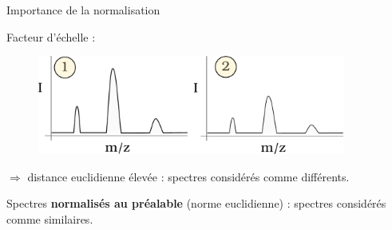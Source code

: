 \documentclass[10pt]{beamer}
\begin{document}
\begin{frame}{Importance de la normalisation}

  Facteur d'échelle :
  \begin{figure}[ht]
    \centering
    \includegraphics[width=0.9\textwidth]{fig/clustering_norm}
    \caption{}
    \label{fig:clustering_norm}
  \end{figure}
  
  \vspace{-0.5cm}
  $\Rightarrow$ distance euclidienne élevée : spectres considérés comme différents.

  Spectres \textbf{normalisés au préalable} (norme euclidienne) : spectres considérés comme similaires.

\end{frame}
\end{document}
